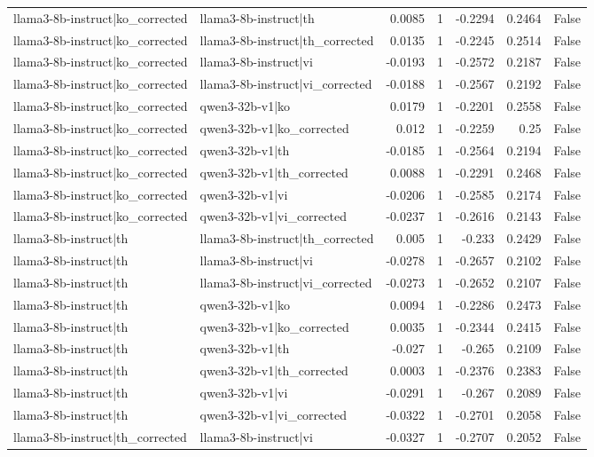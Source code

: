 \begin{table}
\begin{tabular}{l l r r r r l}
llama3-8b-instruct|ko_corrected & llama3-8b-instruct|th & 0.0085 & 1 & -0.2294 & 0.2464 & False \\
llama3-8b-instruct|ko_corrected & llama3-8b-instruct|th_corrected & 0.0135 & 1 & -0.2245 & 0.2514 & False \\
llama3-8b-instruct|ko_corrected & llama3-8b-instruct|vi & -0.0193 & 1 & -0.2572 & 0.2187 & False \\
llama3-8b-instruct|ko_corrected & llama3-8b-instruct|vi_corrected & -0.0188 & 1 & -0.2567 & 0.2192 & False \\
llama3-8b-instruct|ko_corrected & qwen3-32b-v1|ko & 0.0179 & 1 & -0.2201 & 0.2558 & False \\
llama3-8b-instruct|ko_corrected & qwen3-32b-v1|ko_corrected & 0.012 & 1 & -0.2259 & 0.25 & False \\
llama3-8b-instruct|ko_corrected & qwen3-32b-v1|th & -0.0185 & 1 & -0.2564 & 0.2194 & False \\
llama3-8b-instruct|ko_corrected & qwen3-32b-v1|th_corrected & 0.0088 & 1 & -0.2291 & 0.2468 & False \\
llama3-8b-instruct|ko_corrected & qwen3-32b-v1|vi & -0.0206 & 1 & -0.2585 & 0.2174 & False \\
llama3-8b-instruct|ko_corrected & qwen3-32b-v1|vi_corrected & -0.0237 & 1 & -0.2616 & 0.2143 & False \\
llama3-8b-instruct|th & llama3-8b-instruct|th_corrected & 0.005 & 1 & -0.233 & 0.2429 & False \\
llama3-8b-instruct|th & llama3-8b-instruct|vi & -0.0278 & 1 & -0.2657 & 0.2102 & False \\
llama3-8b-instruct|th & llama3-8b-instruct|vi_corrected & -0.0273 & 1 & -0.2652 & 0.2107 & False \\
llama3-8b-instruct|th & qwen3-32b-v1|ko & 0.0094 & 1 & -0.2286 & 0.2473 & False \\
llama3-8b-instruct|th & qwen3-32b-v1|ko_corrected & 0.0035 & 1 & -0.2344 & 0.2415 & False \\
llama3-8b-instruct|th & qwen3-32b-v1|th & -0.027 & 1 & -0.265 & 0.2109 & False \\
llama3-8b-instruct|th & qwen3-32b-v1|th_corrected & 0.0003 & 1 & -0.2376 & 0.2383 & False \\
llama3-8b-instruct|th & qwen3-32b-v1|vi & -0.0291 & 1 & -0.267 & 0.2089 & False \\
llama3-8b-instruct|th & qwen3-32b-v1|vi_corrected & -0.0322 & 1 & -0.2701 & 0.2058 & False \\
llama3-8b-instruct|th_corrected & llama3-8b-instruct|vi & -0.0327 & 1 & -0.2707 & 0.2052 & False \\

\end{tabular}
\end{table}
